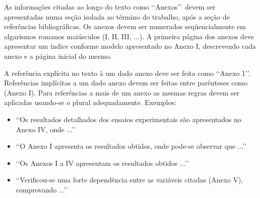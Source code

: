 As informações citadas ao longo do texto como \lq\lq Anexos\rq\rq\ devem ser 
apresentadas numa seção isolada ao término do trabalho, após a seção de 
referências bibliográficas. Os anexos devem ser numerados seqüencialmente em 
algarismos romanos maiúsculos (I, II, III, ...). A primeira página dos anexos 
deve apresentar um índice conforme modelo apresentado no Anexo I, descrevendo 
cada anexo e a página inicial do mesmo.

A referência explícita no texto à um dado anexo deve ser feita como 
\lq\lq Anexo 1\rq\rq. Referências implícitas a um dado anexo devem ser feitas 
entre parênteses como (Anexo I). Para referências a mais de um anexo as mesmas 
regras devem ser aplicadas usando-se o plural adequadamente. Exemplos:
\begin{itemize}
	\item \lq\lq Os resultados detalhados dos ensaios experimentais são 
	apresentados no Anexo IV, onde ...\rq\rq

	\item \lq\lq O Anexo I apresenta os resultados obtidos, onde pode-se 
	observar que ...\rq\rq

	\item \lq\lq Os Anexos I a IV apresentam os resultados obtidos ...\rq\rq

	\item \lq\lq Verificou-se uma forte dependência entre as variáveis citadas 
	(Anexo V), comprovando ...\rq\rq
\end{itemize}

